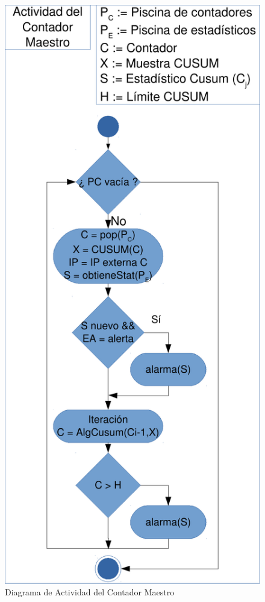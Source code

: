 \begin{figure}[htbp]
\centering
\includegraphics[height=0.5\textheight]{CapituloEstructura/Figuras/ActividadContadorMaestro-crop}
\caption{Diagrama de Actividad del Contador Maestro}
\end{figure}
%

